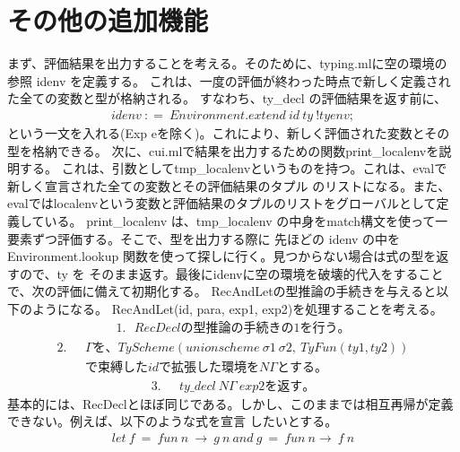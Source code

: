 \documentclass{jreport}
\begin{document}
\section{その他の追加機能}
まず、評価結果を出力することを考える。そのために、typing.mlに空の環境の参照 idenv を定義する。
これは、一度の評価が終わった時点で新しく定義された全ての変数と型が格納される。
すなわち、ty\_decl の評価結果を返す前に、
\begin{equation}
  \begin{split}
    idenv \ \colon = \ Environment.extend \ id \ ty \ !tyenv;
  \end{split}
\end{equation}
という一文を入れる(Exp eを除く)。これにより、新しく評価された変数とその型を格納できる。
次に、cui.mlで結果を出力するための関数print\_localenvを説明する。
これは、引数としてtmp\_localenvというものを持つ。これは、evalで新しく宣言された全ての変数とその評価結果のタプル
のリストになる。また、evalではlocalenvという変数と評価結果のタプルのリストをグローバルとして定義している。
print\_localenv は、tmp\_localenv の中身をmatch構文を使って一要素ずつ評価する。そこで、型を出力する際に
先ほどの idenv の中を Environment.lookup 関数を使って探しに行く。見つからない場合は式の型を返すので、ty を
そのまま返す。最後にidenvに空の環境を破壊的代入をすることで、次の評価に備えて初期化する。
RecAndLetの型推論の手続きを与えると以下のようになる。
RecAndLet(id, para, exp1, exp2)を処理することを考える。
\begin{equation}
  \begin{split}
    1. \ \ \ RecDeclの型推論の手続きの1を行う。
  \end{split}
\end{equation}
\begin{equation}
  \begin{split}
    2. \ \ \ &\Gamma を、TyScheme(unionscheme \ \sigma1 \ \sigma2, \ TyFun(ty1, ty2)) \\ &
    で束縛したidで拡張した環境を N\Gamma とする。
  \end{split}
\end{equation}
\begin{equation}
  \begin{split}
    3. \ \ \ &ty\_decl \ N\Gamma \ exp2を返す。
  \end{split}
\end{equation}
基本的には、RecDeclとほぼ同じである。しかし、このままでは相互再帰が定義できない。例えば、以下のような式を宣言
したいとする。
\begin{equation}
  \begin{split}
    let \ f \ = \ fun \ n \ \to \ g \ n \ and \ g \ = \ fun \ n \to \ f \ n
  \end{split}
\end{equation}
\end{document}
